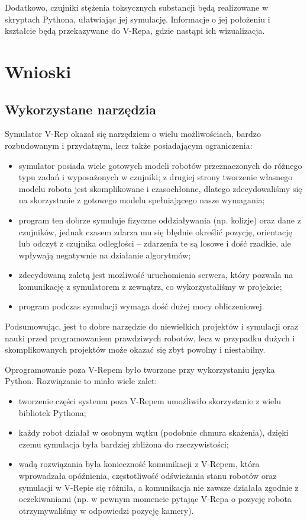 \documentclass[a4paper, 12pt]{article}
\begin{document}
	
	Dodatkowo, czujniki stężenia toksycznych substancji będą realizowane w skryptach Pythona, ułatwiając jej symulację. Informacje o jej położeniu i kształcie będą przekazywane do V-Repa, gdzie nastąpi ich wizualizacja.
	
	
	\section{Wnioski}
	\subsection{Wykorzystane narzędzia}
	Symulator V-Rep okazał się narzędziem o wielu możliwościach, bardzo rozbudowanym i przydatnym, lecz także posiadającym ograniczenia:
	\begin{itemize}
		\item symulator posiada wiele gotowych modeli robotów przeznaczonych do różnego typu zadań i wyposażonych w czujniki; z drugiej strony tworzenie własnego modelu robota jest skomplikowane i czasochłonne, dlatego zdecydowaliśmy się na skorzystanie z gotowego modelu spełniającego nasze wymagania;
		\item program ten dobrze symuluje fizyczne oddziaływania (np. kolizje) oraz dane z czujników, jednak czasem zdarza mu się błędnie określić pozycję, orientację lub odczyt z czujnika odległości -- zdarzenia te są losowe i dość rzadkie, ale wpływają negatywnie na działanie algorytmów;
		\item zdecydowaną zaletą jest możliwość uruchomienia serwera, który pozwala na komunikację z symulatorem z zewnątrz, co wykorzystaliśmy w projekcie;
		\item program podczas symulacji wymaga dość dużej mocy obliczeniowej.
	\end{itemize}
	Podsumowując, jest to dobre narzędzie do niewielkich projektów i symulacji oraz nauki przed programowaniem prawdziwych robotów, lecz w przypadku dużych i skomplikowanych projektów może okazać się zbyt powolny i niestabilny.
	
	Oprogramowanie poza V-Repem było tworzone przy wykorzystaniu języka Python. Rozwiązanie to miało wiele zalet:
	\begin{itemize}
		\item tworzenie części systemu poza V-Repem umożliwiło skorzystanie z wielu bibliotek Pythona;
		\item każdy robot działał w osobnym wątku (podobnie chmura skażenia), dzięki czemu symulacja była bardziej zbliżona do rzeczywistości;
		\item wadą rozwiązania była konieczność komunikacji z V-Repem, która wprowadzała opóźnienia, częstotliwość odświeżania stanu robotów oraz symulacji w V-Repie się różniła, a komunikacja nie zawsze działała zgodnie z oczekiwaniami (np. w pewnym momencie pytając V-Repa o pozycję robota otrzymywaliśmy w odpowiedzi pozycję kamery).
	\end{itemize}
	
\end{document}
